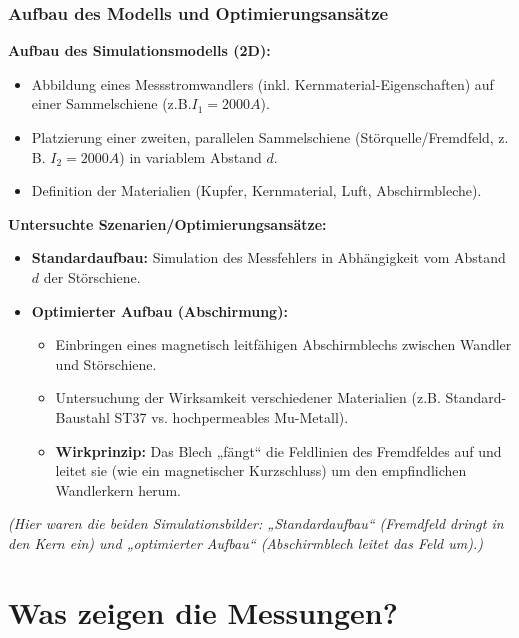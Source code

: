 \begin{frame}
    \frametitle{Aufbau des Modells und Optimierungsansätze}
    \textbf{Aufbau des Simulationsmodells (2D):}
    \begin{itemize}
        \item Abbildung eines Messstromwandlers (inkl. Kernmaterial-Eigenschaften) auf einer Sammelschiene (z.B.$I_1 = 2000 A$).
        \item Platzierung einer zweiten, parallelen Sammelschiene (Störquelle/Fremdfeld, z. B. $I_2 = 2000 A$) in variablem Abstand $d$.
        \item Definition der Materialien (Kupfer, Kernmaterial, Luft, Abschirmbleche).
    \end{itemize}

    \bigskip
    \textbf{Untersuchte Szenarien/Optimierungsansätze:}
    \begin{itemize}
        \item \textbf{Standardaufbau:} Simulation des Messfehlers in Abhängigkeit vom Abstand $d$ der Störschiene.
        \item \textbf{Optimierter Aufbau (Abschirmung):}
              \begin{itemize}
                  \item Einbringen eines magnetisch leitfähigen Abschirmblechs zwischen Wandler und Störschiene.
                  \item Untersuchung der Wirksamkeit verschiedener Materialien (z.B. Standard-Baustahl ST37 vs. hochpermeables Mu-Metall).
                  \item \textbf{Wirkprinzip:} Das Blech „fängt“ die Feldlinien des Fremdfeldes auf und leitet sie (wie ein magnetischer Kurzschluss) um den empfindlichen Wandlerkern herum.
              \end{itemize}
    \end{itemize}
    \vfill
    \begin{center}
        \textit{(Hier waren die beiden Simulationsbilder: „Standardaufbau“ (Fremdfeld dringt in den Kern ein) und „optimierter Aufbau“ (Abschirmblech leitet das Feld um).)}
    \end{center}
\end{frame}


\section*{Was zeigen die Messungen?}

